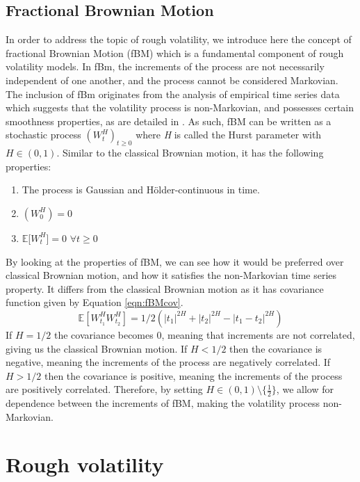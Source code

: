 \documentclass[12pt,oneside]{article}
\begin{document}
\subsection{Fractional Brownian Motion}
\label{sec:fractionalBm}
In order to address the topic of rough volatility, we introduce here the concept of fractional Brownian Motion (fBM) which is a fundamental component of rough volatility models. In fBm, the increments of the process are not necessarily independent of one another, and the process cannot be considered Markovian. The inclusion of fBm originates from the analysis of empirical time series data which suggests that the volatility process is non-Markovian, and possesses certain smoothness properties, as are detailed in \cite{gatheral2014volatility}. As such, fBM can be written as a stochastic process $(W^H_t)_{t\ge0}$ where \textit{H} is called the Hurst parameter with $\textit{H} \in (0,1)$. Similar to the classical Brownian motion, it has the following properties: 
\begin{enumerate} 
\item The process is Gaussian and H\"{o}lder-continuous in time. 
\item $(\textit{$W^H_0$})=0$  
\item $\mathbb{E}$[\textit{$W^H_t$}]$=0$   
$\forall t \ge 0$ 
\end{enumerate}
 By looking at the properties of fBM, we can see how it would be preferred over classical Brownian motion, and how it satisfies the non-Markovian time series property. It differs from the classical Brownian motion as it has covariance function given by Equation \ref{eqn:fBMcov}.
\begin{equation}
\label{eqn:fBMcov}
\mathbb{E}[W^H_{t_1}W^H_{t_2}]=1/2(|t_1|^{2H}+|t_2|^{2H}-|t_1-t_2|^{2H})
\end{equation}
If $H=1/2$ the covariance becomes 0, meaning that increments are not correlated, giving us the classical Brownian motion. If $H<1/2$ then the covariance is negative, meaning the increments of the process are negatively correlated. If $H>1/2$ then the covariance is positive, meaning the increments of the process are positively correlated. Therefore, by setting $H\in(0,1)\setminus\{\frac{1}{2}\}$, we allow for dependence between the increments of fBM, making the volatility process non-Markovian.

\section{Rough volatility}
\label{sec:rough_volatility}
\end{document}
